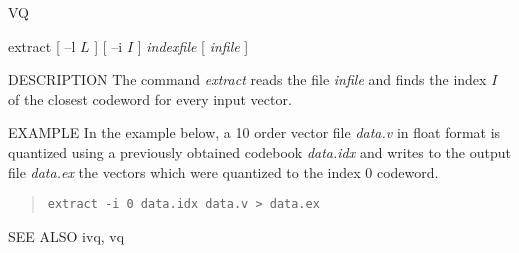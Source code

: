 %
{VQ}

\begin{synopsis}
\item [extract] [ --l $L$ ] [ --i $I$ ]  {\em indexfile}  [ {\em infile} ] 
\end{synopsis}

\begin{qsection}{DESCRIPTION}
The command {\em extract} reads the file {\em infile}
and finds the index $I$ of the closest codeword for every 
input vector.
\end{qsection}


\begin{qsection}{EXAMPLE}
In the example below, a 10 order vector file {\em data.v}
in float format is quantized using a previously obtained
codebook {\em data.idx} and writes to the output file {\em data.ex}
the vectors which were quantized to the index 0 codeword.
\begin{quote}
\verb!extract -i 0 data.idx data.v > data.ex!
\end{quote}
\end{qsection}

\begin{qsection}{SEE ALSO}
ivq, vq
\end{qsection}

